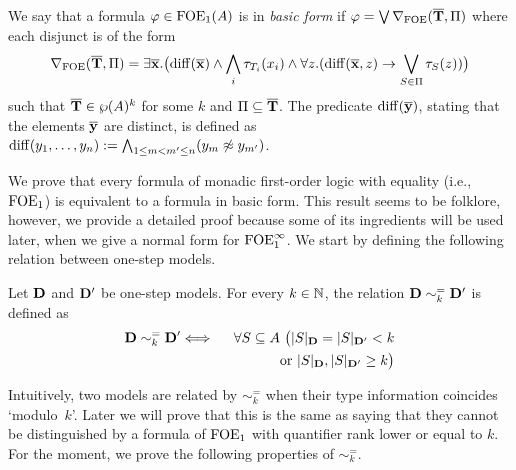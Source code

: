 \begin{definition}%
We say that a formula $\varphi \in \mathrm{FOE}_1(A)$ is in \emph{basic form} if $\varphi = \bigvee \nabla_{\mathrm{FOE}}(\overline{{\mathbf{T}}},\Pi)$ where each disjunct is of the form
%
\begin{equation*}%
\dbnfofoe{\vlist{T}}{\Pi} = \exists \vlist{x}.\big(\arediff{\vlist{x}} \land \bigwedge_i \tau_{T_i}(x_i) \land \forall z.(\arediff{\vlist{x},z} \lthen \bigvee_{S\in \Pi} \tau_S(z))\big)
\end{equation*}
%
such that $\overline{{\mathbf{T}}} \in \wp(A)^k$ for some $k$ and $\Pi \subseteq \overline{{\mathbf{T}}}$.  The predicate $\mathrm{diff}(\overline{{\mathbf{y}}})$, stating that the elements $\overline{{\mathbf{y}}}$ are distinct, is defined as $\mathrm{diff}(y_1,\dots,y_n) := \bigwedge_{1\leq m < m^{\prime} \leq n} (y_m \not\approx y_{m^{\prime}})$.
\end{definition}

We prove that every formula of monadic first-order logic with equality (i.e., $\mathrm{FOE}_1$) is equivalent to a formula in basic form. This result seems to be folklore, however, we provide a detailed proof because some of its ingredients will be used later, when we give a normal form for $\mathrm{FOE}^{\infty}_1$. We start by defining the following relation between one-step models.

\begin{definition}
	Let $\mathbf{D}$ and $\mathbf{D}'$ be one-step models. For every $k \in \mathbb{N}$, the relation $\mathbf{D} \sim^=_k \mathbf{D}'$ is defined as
\begin{eqnarray*}
	\osmodel \sim^=_k \osmodel' & \Longleftrightarrow & \forall S\subseteq A \ \big(
	   |S|_\osmodel = |S|_{\osmodel'} < k \\
	&& \qquad\qquad \text{or } |S|_\osmodel,|S|_{\osmodel'} \geq k \big)
\end{eqnarray*}
\end{definition}

Intuitively, two models are related by $\sim^=_k$ when their type information coincides `modulo~$k$'. Later we will prove that this is the same as saying that they cannot be distinguished by a formula of $\mathrm{FOE}_1$ with quantifier rank lower or equal to $k$. For the moment, we prove the following properties of $\sim^=_k$.


